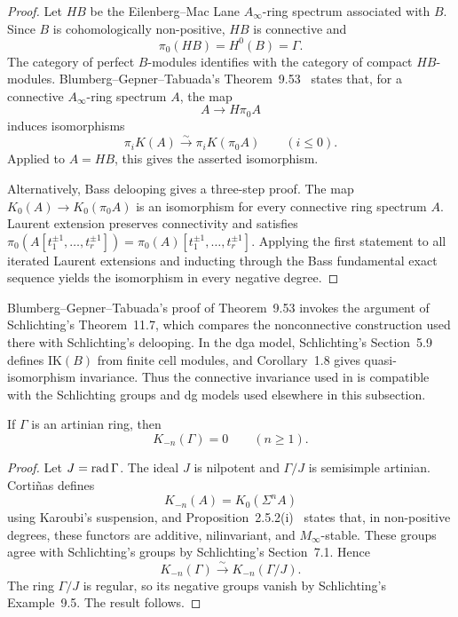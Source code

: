 \begin{proof}
Let \(HB\) be the Eilenberg--Mac Lane \(A_\infty\)-ring spectrum associated with \(B\).  Since \(B\) is cohomologically non-positive, \(HB\) is connective and
\[
 \pi_0(HB)=H^0(B)=\Gamma.
\]
The category of perfect \(B\)-modules identifies with the category of compact \(HB\)-modules.  Blumberg--Gepner--Tabuada's Theorem~9.53~\cite{BGT13} states that, for a connective \(A_\infty\)-ring spectrum \(A\), the map
\[
 A\longrightarrow H\pi_0A
\]
induces isomorphisms
\[
 \pi_iK(A)\xrightarrow{\sim}\pi_iK(\pi_0A)
 \qquad(i\le0).
\]
Applied to \(A=HB\), this gives the asserted isomorphism.

Alternatively, Bass delooping gives a three-step proof.  The map \(K_0(A)\to K_0(\pi_0A)\) is an isomorphism for every connective ring spectrum \(A\).  Laurent extension preserves connectivity and satisfies \(\pi_0(A[t_1^{\pm1},\ldots,t_r^{\pm1}])=\pi_0(A)[t_1^{\pm1},\ldots,t_r^{\pm1}]\).  Applying the first statement to all iterated Laurent extensions and inducting through the Bass fundamental exact sequence yields the isomorphism in every negative degree.
\end{proof}

\begin{remark}\label{rem:bgt-schlichting-compatibility}
Blumberg--Gepner--Tabuada's proof of Theorem~9.53 invokes the argument of Schlichting's Theorem~11.7, which compares the nonconnective construction used there with Schlichting's delooping.  In the dga model, Schlichting's Section~5.9 defines \(\mathrm{IK}(B)\) from finite cell modules, and Corollary~1.8 gives quasi-isomorphism invariance.  Thus the connective invariance used in  is compatible with the Schlichting groups and dg models used elsewhere in this subsection.
\end{remark}

\begin{lemma}\label{lem:artinian-negative-k}
If \(\Gamma\) is an artinian ring, then
\[
 K_{-n}(\Gamma)=0
 \qquad(n\ge1).
\]
\end{lemma}

\begin{proof}
Let \(J=\operatorname{rad}\Gamma\).  The ideal \(J\) is nilpotent and \(\Gamma/J\) is semisimple artinian.  Corti{\~n}as defines
\[
 K_{-n}(A)=K_0(\Sigma^nA)
\]
using Karoubi's suspension, and Proposition~2.5.2(i)~\cite{Cortinas11} states that, in non-positive degrees, these functors are additive, nilinvariant, and \(M_\infty\)-stable.  These groups agree with Schlichting's groups by Schlichting's Section~7.1.  Hence
\[
 K_{-n}(\Gamma)\xrightarrow{\sim}K_{-n}(\Gamma/J).
\]
The ring \(\Gamma/J\) is regular, so its negative groups vanish by Schlichting's Example~9.5.  The result follows.
\end{proof}

